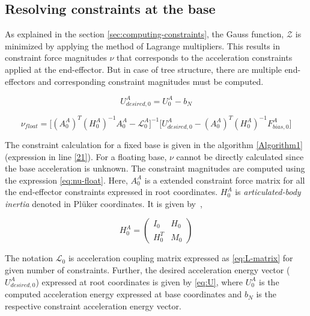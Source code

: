\subsection{Resolving constraints at the base}

As explained in the section \ref{sec:computing-constraints}, the Gauss function, $\mathcal{Z}$ is minimized by applying the method of Lagrange multipliers. This results in constraint force magnitudes $\nu$ that corresponds to the acceleration constraints applied at the end-effector. But in case of tree structure, there are multiple end-effectors and corresponding constraint magnitudes must be computed. 



\begin{equation}\label{eq:U}
	U_{desired, 0}^A = U_0^A - b_N 
\end{equation}

\begin{equation}\label{eq:nu-float}
	\nu_{float} = \big[ (A_0^A)^T (H_0^A)^{-1} A_0^A - \mathcal{L}_0^A \big]^{-1} \big[ U_{desired, 0}^A - (A_0^A)^T (H_0^A)^{-1} F_{bias, 0}^A \big]
\end{equation}


The constraint calculation for a fixed base is given in the algorithm \ref{Algorithm1} (expression in line \ref{21}). For a floating base, $\nu$ cannot be directly calculated since the base acceleration is unknown. The constraint magnitudes are computed using the expression \ref{eq:nu-float}. Here, $A_0^A$ is a extended constraint force matrix for all the end-effector constraints expressed in root coordinates. $H_0^A$ is \textit{articulated-body inertia} denoted in Pl{\"u}ker coordinates. It is given by~\cite{featherstone2014rigid},

\begin{equation}
	\label{eq:RBI}
	H_0^A = \begin{pmatrix}
		I_0 & H_0 \\
		H_0^T & M_0
	\end{pmatrix}
\end{equation}

The notation $\mathcal{L}_0$ is acceleration coupling matrix expressed as \ref{eq:L-matrix} for given number of constraints. Further, the desired acceleration energy vector ($U_{desired, 0}^A$) expressed at root coordinates is given by \ref{eq:U}, where $U_0^A$ is the computed acceleration energy expressed at base coordinates and $b_N$ is the respective constraint acceleration energy vector. 


